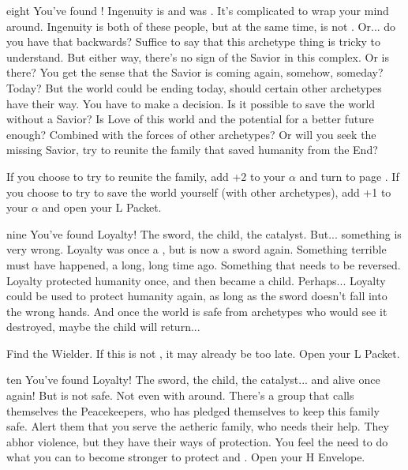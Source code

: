\documentclass[greennotebook]{Silversiders} %
\begin{document}
\begin{page}{eight}
You've found \cIngenuity{\them}! Ingenuity is \cIngenuity{\intro} and was \cIngenuityOld{\intro}. It's complicated to wrap your mind around. Ingenuity is both of these people, but at the same time, \cIngenuity{} is not \cIngenuityOld{}. Or... do you have that backwards? Suffice to say that this archetype thing is tricky to understand. But either way, there's no sign of the Savior in this complex. Or is there?
You get the sense that the Savior is coming again, somehow, someday? Today? But the world could be ending today, should certain other archetypes have their way. You have to make a decision. Is it possible to save the world without a Savior? Is Love of this world and the potential for a better future enough? Combined with the forces of other archetypes? Or will you seek the missing Savior, try to reunite the family that saved humanity from the End?

If you choose to try to reunite the family, add +2 to your $\alpha$ and turn to page .
If you choose to try to save the world yourself (with other archetypes), add +1 to your $\alpha$ and open your L Packet.
\end{page}

\begin{page}{nine}
You've found Loyalty! The sword, the child, the catalyst. But... something is very wrong. Loyalty was once a \cLoyalty{\kid}, but is now a sword again. Something terrible must have happened, a long, long time ago. Something that needs to be reversed. Loyalty protected humanity once, and then became a child. Perhaps... Loyalty could be used to protect humanity again, as long as the sword doesn't fall into the wrong hands. And once the world is safe from archetypes who would see it destroyed, maybe the child will return...

Find the Wielder. If this is not \cIngenuity{}, it may already be too late. Open your L Packet.
\end{page}

\begin{page}{ten}
You've found Loyalty! The sword, the child, the catalyst... and alive once again! But \cLoyalty{\they} is not safe. Not even with \cIngenuity{} around. There's a group that calls themselves the Peacekeepers, who has pledged themselves to keep this family safe. Alert them that you serve the aetheric family, who needs their help. They abhor violence, but they have their ways of protection. You feel the need to do what you can to become stronger to protect \cLoyalty{} and \cIngenuity{}. Open your H Envelope.
\end{page}
\end{document}
